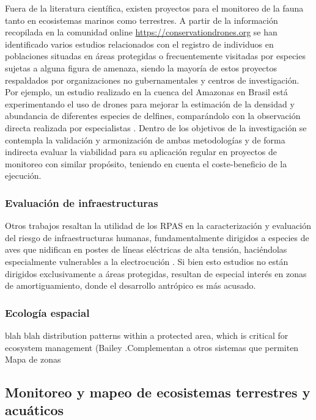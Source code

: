 \documentclass[11pt,]{article}
\begin{document}
Fuera de la literatura científica, existen proyectos para el monitoreo
de la fauna tanto en ecosistemas marinos como terrestres. A partir de la
información recopilada en la comunidad online
\url{https://conservationdrones.org} se han identificado varios estudios
relacionados con el registro de individuos en poblaciones situadas en
áreas protegidas o frecuentemente visitadas por especies sujetas a
alguna figura de amenaza, siendo la mayoría de estos proyectos
respaldados por organizaciones no gubernamentales y centros de
investigación. Por ejemplo, un estudio realizado en la cuenca del
Amazonas en Brasil está experimentando el uso de drones para mejorar la
estimación de la densidad y abundancia de diferentes especies de
delfines, comparándolo con la observación directa realizada por
especialistas \citep{WichS2017}. Dentro de los objetivos de la
investigación se contempla la validación y armonización de ambas
metodologías y de forma indirecta evaluar la viabilidad para su
aplicación regular en proyectos de monitoreo con similar propósito,
teniendo en cuenta el coste-beneficio de la ejecución.

\subsubsection{Evaluación de
infraestructuras}\label{evaluacion-de-infraestructuras}

Otros trabajos resaltan la utilidad de los RPAS en la caracterización y
evaluación del riesgo de infraestructuras humanas, fundamentalmente
dirigidos a especies de aves que nidifican en postes de líneas
eléctricas de alta tensión, haciéndolas especialmente vulnerables a la
electrocución \citep{Mulero-Pazmany2014a}. Si bien esto estudios no
están dirigidos exclusivamente a áreas protegidas, resultan de especial
interés en zonas de amortiguamiento, donde el desarrollo antrópico es
más acusado.

\subsubsection{Ecología espacial}\label{ecologia-espacial}

\citep{PazmanyMulero2015} blah blah distribution patterns within a
protected area, which is critical for ecosystem management (Bailey
.Complementan a otros sistemas que permiten Mapa de zonas

\subsection{Monitoreo y mapeo de ecosistemas terrestres y
acuáticos}\label{monitoreo-y-mapeo-de-ecosistemas-terrestres-y-acuaticos}
\end{document}
